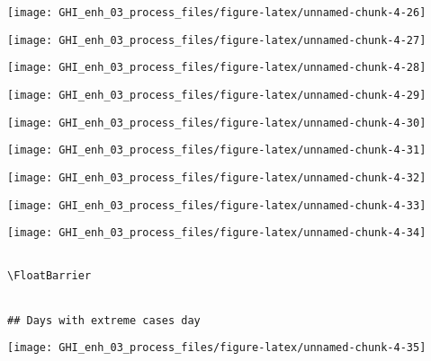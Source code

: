 \documentclass[
  10pt,
  a4paper,oneside]{article}
\begin{document}
\begin{center}\texttt{[image: GHI\_enh\_03\_process\_files/figure-latex/unnamed-chunk-4-26]} \end{center}

\begin{center}\texttt{[image: GHI\_enh\_03\_process\_files/figure-latex/unnamed-chunk-4-27]} \end{center}

\begin{center}\texttt{[image: GHI\_enh\_03\_process\_files/figure-latex/unnamed-chunk-4-28]} \end{center}

\begin{center}\texttt{[image: GHI\_enh\_03\_process\_files/figure-latex/unnamed-chunk-4-29]} \end{center}

\begin{center}\texttt{[image: GHI\_enh\_03\_process\_files/figure-latex/unnamed-chunk-4-30]} \end{center}

\begin{center}\texttt{[image: GHI\_enh\_03\_process\_files/figure-latex/unnamed-chunk-4-31]} \end{center}

\begin{center}\texttt{[image: GHI\_enh\_03\_process\_files/figure-latex/unnamed-chunk-4-32]} \end{center}

\begin{center}\texttt{[image: GHI\_enh\_03\_process\_files/figure-latex/unnamed-chunk-4-33]} \end{center}

\begin{center}\texttt{[image: GHI\_enh\_03\_process\_files/figure-latex/unnamed-chunk-4-34]} \end{center}

\begin{verbatim}

\FloatBarrier


## Days with extreme cases day 
\end{verbatim}

\begin{center}\texttt{[image: GHI\_enh\_03\_process\_files/figure-latex/unnamed-chunk-4-35]} \end{center}
\end{document}
